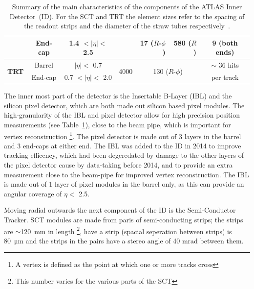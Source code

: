 {\begin{table}[!htb]
\begin{tabular}{|cc||c|c|rr|c|}
                         & End-cap   &        1.4  $\lt |\eta| \lt$  2.5    &                   &  17 ($R$-$\phi$)        & 580 ($R$)          & 9 (both ends)    \\ %
  \hline                                                                                                                                                
  \multirow{2}{*}{\textbf{TRT}}   & Barrel    & $|\eta| \lt$  0.7             & \multirow{2}{*}{4000}     & \multicolumn{2}{c|}{\multirow{2}{*}{130 ($R$-$\phi$)}}     & $\sim$ 36 hits    \\ %
                         & End-cap   &         0.7  $\lt |\eta| \lt$  2.0    &                  &                         &                  & per track        \\ %
  \hline
\end{tabular}
\caption[Summary of the main characteristics of the components of the ATLAS Inner Detector.]
        {Summary of the main characteristics of the components of the ATLAS Inner Detector~(ID). For the SCT and TRT the element sizes refer to the spacing of the readout strips and the diameter of the straw tubes respectively~\cite{det-ATLAS_Exp,det-ID_table}.}
\label{tab:det-ID}
\end{table}
}


The inner most part of the detector is the Insertable B-Layer (IBL) and the silicon pixel detector,
which are both made out silicon based pixel modules.
The high-granularity of the IBL and pixel detector allow for high precision position measurements (see Table~\ref{tab:det-ID}),
close to the beam pipe, which is important for vertex reconstruction \footnote{ A vertex is defined as the point at which one or more tracks cross}.
The pixel detector is made out of 3 layers in the barrel and 3 end-caps at either end.
The IBL was added to the ID in 2014 to improve tracking efficency,
which had been degeredated by damage to the other layers of the pixel detector cause by data-taking before 2014,
and to provide an extra measurement close to the beam-pipe for improved vertex reconstruction.
The IBL is made out of 1 layer of pixel modules in the barrel only, as this can provide an angular coverage of $\eta <$ 2.5.


Moving radial outwards the next component of the ID is the Semi-Conductor Tracker.
SCT modules are made from paris of semi-conducting strips;
the strips are $\sim$\SI{120}{\mm} in length \footnote{ This number varies for the various parts of the SCT},
have a strip  (spacial seperation between strips) is \SI{80}{\micro\metre}
and the strips in the pairs have a stereo angle of 40 mrad between them.

